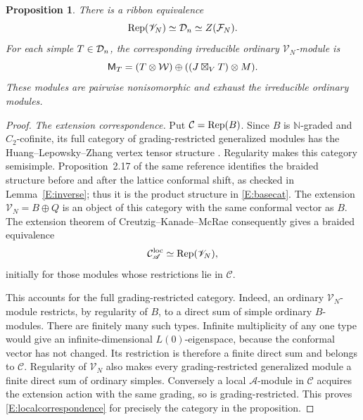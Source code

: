 \documentclass[11pt]{article}
\newtheorem{proposition}[theorem]{Proposition}
\numberwithin{equation}{section}
\begin{document}
\begin{proposition}\label{E:category}
There is a ribbon equivalence
\[
\operatorname{Rep}(\mathscr{V}_N)\simeq\mathcal D_n\simeq Z(\mathcal F_N).
\]
For each simple $T\in\mathcal D_n$, the corresponding irreducible ordinary $\mathscr{V}_N$-module is
\begin{equation}\label{E:ET}
\mathsf M_T=(T\otimes \mathcal W)\oplus((J\boxtimes_V T)\otimes M).
\end{equation}
These modules are pairwise nonisomorphic and exhaust the irreducible ordinary modules.
\end{proposition}
\begin{proof}
\emph{The extension correspondence.} Put $\mathcal C=\operatorname{Rep}(B)$. Since $B$ is $\mathbb N$-graded and $C_2$-cofinite, its full category of grading-restricted generalized modules has the Huang--Lepowsky--Zhang vertex tensor structure \cite[Section~2.3]{A:McR}. Regularity makes this category semisimple. Proposition~2.17 of the same reference identifies the braided structure before and after the lattice conformal shift, as checked in Lemma~\ref{E:inverse}; thus it is the product structure in \eqref{E:basecat}. The extension $\mathscr{V}_N=B\oplus Q$ is an object of this category with the same conformal vector as $B$. The extension theorem of Creutzig--Kanade--McRae \cite[Theorem~3.65]{E:CKMext} consequently gives a braided equivalence
\begin{equation}\label{E:localcorrespondence}
\mathcal C_{\mathscr A}^{\mathrm{loc}}\simeq\operatorname{Rep}(\mathscr{V}_N),
\end{equation}
initially for those modules whose restrictions lie in $\mathcal C$.

This accounts for the full grading-restricted category. Indeed, an ordinary $\mathscr{V}_N$-module restricts, by regularity of $B$, to a direct sum of simple ordinary $B$-modules. There are finitely many such types. Infinite multiplicity of any one type would give an infinite-dimensional $L(0)$-eigenspace, because the conformal vector has not changed. Its restriction is therefore a finite direct sum and belongs to $\mathcal C$. Regularity of $\mathscr{V}_N$ also makes every grading-restricted generalized module a finite direct sum of ordinary simples. Conversely a local $\mathscr A$-module in $\mathcal C$ acquires the extension action with the same grading, so is grading-restricted. This proves \eqref{E:localcorrespondence} for precisely the category in the proposition.


\end{proof}
\end{document}
